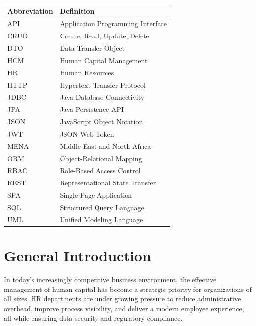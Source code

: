 \documentclass[12pt,a4paper]{report}
\renewcommand{\arraystretch}{1.5}
\begin{document}
\begin{table}[H]
\renewcommand{\arraystretch}{1.6}
\begin{tabular}{|C{3cm}|L{10cm}|}
\hline
{}
\textbf{Abbreviation} & \textbf{Definition} \\
\hline
API   & Application Programming Interface \\
\hline
CRUD  & Create, Read, Update, Delete \\
\hline
DTO   & Data Transfer Object \\
\hline
HCM   & Human Capital Management \\
\hline
HR    & Human Resources \\
\hline
HTTP  & Hypertext Transfer Protocol \\
\hline
JDBC  & Java Database Connectivity \\
\hline
JPA   & Java Persistence API \\
\hline
JSON  & JavaScript Object Notation \\
\hline
JWT   & JSON Web Token \\
\hline
MENA  & Middle East and North Africa \\
\hline
ORM   & Object-Relational Mapping \\
\hline
RBAC  & Role-Based Access Control \\
\hline
REST  & Representational State Transfer \\
\hline
SPA   & Single-Page Application \\
\hline
SQL   & Structured Query Language \\
\hline
UML   & Unified Modeling Language \\
\hline
\end{tabular}
\end{table}

\newpage

\chapter*{General Introduction}

In today's increasingly competitive business environment, the effective management of human
capital has become a strategic priority for organizations of all sizes. HR departments are
under growing pressure to reduce administrative overhead, improve process visibility, and
deliver a modern employee experience, all while ensuring data security and regulatory
compliance.
\end{document}
